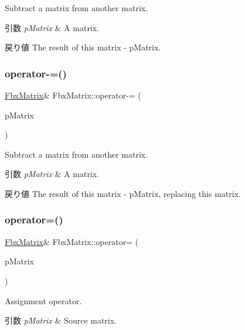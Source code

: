 Subtract a matrix from another matrix. 
\begin{DoxyParams}{引数}
{\em p\+Matrix} & A matrix. \\
\hline
\end{DoxyParams}
\begin{DoxyReturn}{戻り値}
The result of this matrix -\/ p\+Matrix. 
\end{DoxyReturn}
\mbox{\label{class_fbx_matrix_a915b0943d6c81166423360bdd913d1d3}} 
\subsubsection{\texorpdfstring{operator-\/=()}{operator-=()}}
{\footnotesize\ttfamily \hyperlink{class_fbx_matrix}{Fbx\+Matrix}\& Fbx\+Matrix\+::operator-\/= (\begin{DoxyParamCaption}\item[{const \hyperlink{class_fbx_matrix}{Fbx\+Matrix} \&}]{p\+Matrix }\end{DoxyParamCaption})}

Subtract a matrix from another matrix. 
\begin{DoxyParams}{引数}
{\em p\+Matrix} & A matrix. \\
\hline
\end{DoxyParams}
\begin{DoxyReturn}{戻り値}
The result of this matrix -\/ p\+Matrix, replacing this matrix. 
\end{DoxyReturn}
\mbox{\label{class_fbx_matrix_a45fad935c08ef083dddd3adddc3d6884}} 
\subsubsection{\texorpdfstring{operator=()}{operator=()}}
{\footnotesize\ttfamily \hyperlink{class_fbx_matrix}{Fbx\+Matrix}\& Fbx\+Matrix\+::operator= (\begin{DoxyParamCaption}\item[{const \hyperlink{class_fbx_matrix}{Fbx\+Matrix} \&}]{p\+Matrix }\end{DoxyParamCaption})}

Assignment operator. 
\begin{DoxyParams}{引数}
{\em p\+Matrix} & Source matrix. \\
\hline
\end{DoxyParams}
\mbox{\label{class_fbx_matrix_af6bccfe44b18342ed8dd8c9240ff1485}} 
